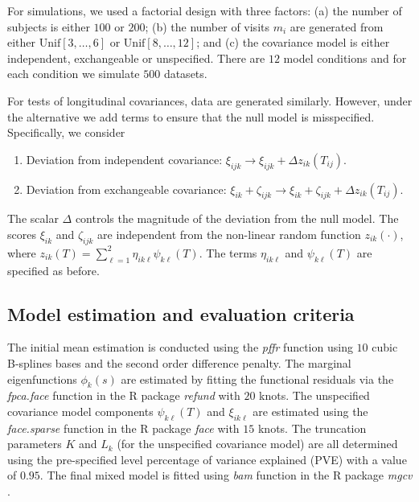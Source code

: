 \documentclass[submit]{smj}
\begin{document}
For simulations, we used a factorial design with three factors: (a) the number of subjects is either $100$ or $200$; (b) the number of visits $m_i$ are generated from either $\text{Unif}[3,\ldots, 6]$ or $\text{Unif}[8,\ldots, 12]$; and (c) the covariance model is either independent, exchangeable or unspecified. There are $12$ model conditions and for each condition we simulate $500$ datasets. 

For tests of longitudinal covariances,
data are generated similarly. However, under the alternative we add terms  to ensure that the null model is misspecified. Specifically, we consider
\begin{enumerate}
	\item Deviation from independent covariance: $\xi_{ijk}\rightarrow \xi_{ijk} + \Delta z_{ik}(T_{ij})$\;.
	\item Deviation from exchangeable covariance: $\xi_{ik} + \zeta_{ijk}\rightarrow \xi_{ik} + \zeta_{ijk}+ \Delta z_{ik}(T_{ij})$\;.
\end{enumerate}
The scalar $\Delta$ controls the magnitude of the deviation from the null model. The scores $\xi_{ik}$ and $\zeta_{ijk}$ are independent from the non-linear random function $z_{ik}(\cdot)$, where $z_{ik}(T) = \sum_{\ell=1}^2\eta_{ik\ell}\psi_{k\ell}(T)$. The terms $\eta_{ik\ell}$ and $\psi_{k\ell}(T)$ are specified as before.



\subsection{Model estimation and evaluation criteria}
The initial mean estimation is conducted using the {\it pffr} function using $10$ cubic B-splines bases and the second order difference penalty. The  marginal eigenfunctions $\phi_k(s)$ are estimated by fitting the  functional residuals  via the  {\it fpca.face} function \citep{Xiao2016} in the R package {\it refund} with $20$ knots. The unspecified covariance model components $\psi_{k\ell}(T)$ and $\xi_{ik\ell}$ are estimated using  the {\it face.sparse} function in the R package {\it face} with $15$ knots. The truncation parameters $K$ and $L_k$ (for the unspecified covariance model) are all determined using the pre-specified level percentage of variance explained (PVE) with a value of $0.95$. The final mixed model is fitted using {\it bam} function \citep{Wood2015} in the R package {\it mgcv} \citep{mgcv2019}.
\end{document}
